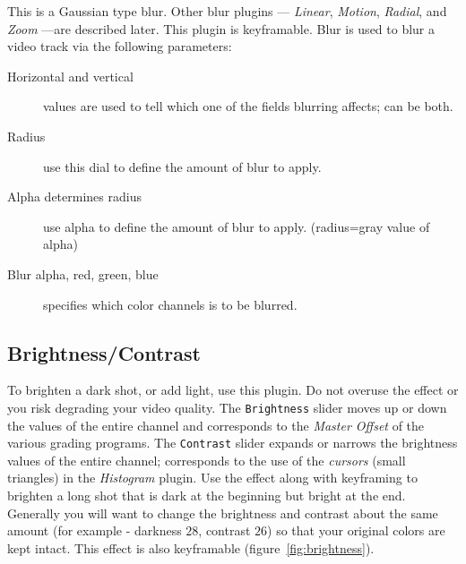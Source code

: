 This is a Gaussian type blur. Other blur plugins --- \textit{Linear}, \textit{Motion}, \textit{Radial}, and \textit{Zoom} ---are described later. This plugin is keyframable. Blur is used to blur a video track via the following parameters:
\begin{description}
    \item[Horizontal and vertical] values are used to tell which one of the fields blurring affects; can be both.
    \item[Radius] use this dial to define the amount of blur to apply.
    \item[Alpha determines radius] use alpha to define the amount of blur to apply. (radius=gray value of alpha)
    \item[Blur alpha, red, green, blue] specifies which color channels is to be blurred.
\end{description}

\subsection{Brightness/Contrast}%
\label{sub:brightness_contrast}

To brighten a dark shot, or add light, use this plugin. Do not overuse the effect or you risk degrading your video quality.
The \texttt{Brightness} slider moves up or down the values of the entire channel and corresponds to the \textit{Master Offset} of the various grading programs.
The \texttt{Contrast} slider expands or narrows the brightness values of the entire channel; corresponds to the use of the \textit{cursors} (small triangles) in the \textit{Histogram} plugin.
Use the effect along with keyframing to brighten a long shot that is dark at the beginning but bright at the end. Generally you will want to change the brightness and contrast about the same amount (for example - darkness $28$, contrast $26$) so that your original colors are kept intact. This effect is also keyframable (figure~\ref{fig:brightness}).

